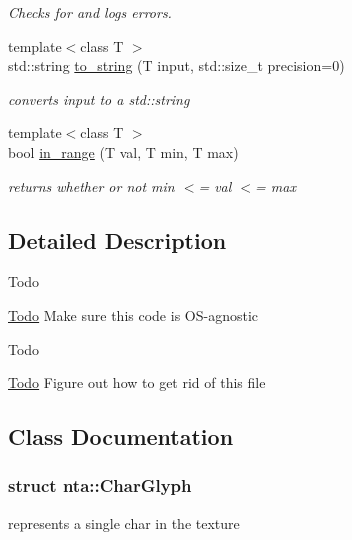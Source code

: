 \begin{DoxyCompactItemize}
\begin{DoxyCompactList}\small\item\em Checks for and logs errors. \end{DoxyCompactList}\item 
\mbox{\label{namespacenta_a7521a21e7957d0b80c6c54eb2a80d63d}} 
{\footnotesize template$<$class T $>$ }\\std\+::string \hyperlink{namespacenta_a7521a21e7957d0b80c6c54eb2a80d63d}{to\+\_\+string} (T input, std\+::size\+\_\+t precision=0)
\begin{DoxyCompactList}\small\item\em converts input to a std\+::string \end{DoxyCompactList}\item 
\mbox{\label{namespacenta_a5c6b09bba75d5132dad154b02fee6727}} 
{\footnotesize template$<$class T $>$ }\\bool \hyperlink{namespacenta_a5c6b09bba75d5132dad154b02fee6727}{in\+\_\+range} (T val, T min, T max)
\begin{DoxyCompactList}\small\item\em returns whether or not min $<$= val $<$= max \end{DoxyCompactList}\end{DoxyCompactItemize}


\subsection{Detailed Description}
\begin{DoxyRefDesc}{Todo}
\item[\hyperlink{todo__todo000009}{Todo}]Make sure this code is O\+S-\/agnostic \end{DoxyRefDesc}


\begin{DoxyRefDesc}{Todo}
\item[\hyperlink{todo__todo000016}{Todo}]Figure out how to get rid of this file \end{DoxyRefDesc}


\subsection{Class Documentation}
\label{structnta_1_1CharGlyph}
\subsubsection{struct nta\+:\+:Char\+Glyph}
represents a single char in the texture 

